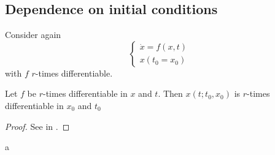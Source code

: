 \subsection{Dependence on initial conditions}

Consider again
\begin{equation}
\begin{cases}
    \dot x = f(x,t)\\
    x(t_0 = x_0)
\end{cases}
\end{equation}
with $f$ $r$-times differentiable.

\begin{framed}
\begin{theorem}
    Let $f$ be $r$-times differentiable in $x$ and $t$. Then $x(t;t_0,x_0)$ is $r$-times differentiable in $x_0$ and $t_0$
\end{theorem}
\end{framed}
\begin{proof}
    See in \cite{arnoldODE}.
\end{proof}

a